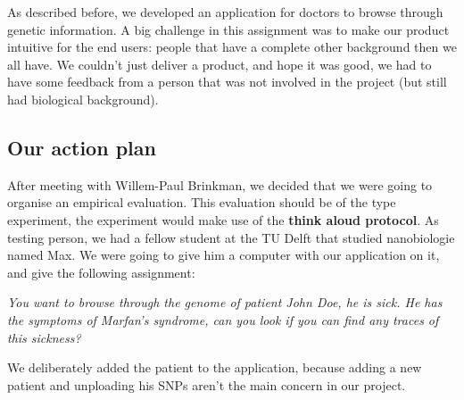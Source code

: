 As described before, we developed an application for doctors to browse through genetic information. A big challenge in this assignment was to make our product intuitive for the end users: people that have a complete other background then we all have. We couldn't just deliver a product, and hope it was good, we had to have some feedback from a person that was not involved in the project (but still had biological background). 
\subsection{Our action plan}
After meeting with Willem-Paul Brinkman, we decided that we were going to organise an empirical evaluation. This evaluation should be of the type experiment, the experiment would make use of the \textbf{think aloud protocol}. As testing person, we had a fellow student at the TU Delft that studied nanobiologie named Max. We were going to give him a computer with our application on it, and give the following assignment:\\
\begin{addmargin}[2em]{2em}
\textit{You want to browse through the genome of patient John Doe, he is sick. He has the symptoms of Marfan's syndrome, can you look if you can find any traces of this sickness?\\ }
\end{addmargin} 
We deliberately added the patient to the application, because adding a new patient and unploading his SNPs aren't the main concern in our project.
